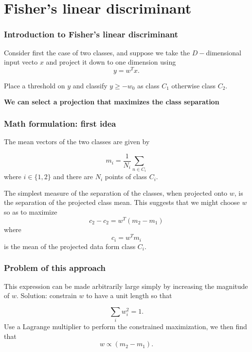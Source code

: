 \section{Fisher's linear discriminant} 

\begin{frame}
    \frametitle{Introduction to Fisher's linear discriminant}

    Consider first the case of 
    two classes, and suppose we take the
    $D-$dimensional input vecto $x$ and project it down to one 
    dimension using 
    \begin{equation}\label{eq:05:projection}
        y = w^T x. 
    \end{equation}

    Place a threshold on $y$ and classify
    $y \geq -w_0$ as class $C_1$ otherwise class $C_2$. 

    \textbf{We can select a projection that maximizes the class separation}
\end{frame}

\begin{frame}
    \frametitle{Math formulation: first idea}
    The mean vectors of the two classes are given by

    \begin{equation}
        m_i = 
        \frac{1}{N_i} 
        \sum_{n \in C_i}
    \end{equation}
    where $i \in \{1,2\}$ and there are $N_i$ points of class $C_i$.
    
    The simplest measure of the separation of the classes,
    when projected onto $w$, is the 
    separation of the projected class mean.
    This suggests that we might choose $w$ so as to maximize 
    \begin{equation}
        c_2 - c_2 = w^T (m_2 - m_1)
    \end{equation}
    where 
    \begin{equation}\label{eq:05:proyected_mean}
        c_i = w^T m_i
    \end{equation}
    is the mean of the projected data form class $C_i$. 
\end{frame}

\begin{frame}
    \frametitle{Problem of this approach}
    This expression can be made arbitrarily large simply by increasing the magnitude of $w$. 
    Solution: constrain $w$ to have a unit length so that 

    \begin{equation}
        \sum_i w^2_i = 1.
    \end{equation}
    Use a Lagrange multiplier to perform the constrained maximization,
    we then find that 
    \begin{equation}
        w \propto (m_2 - m_1).
    \end{equation}
\end{frame}

